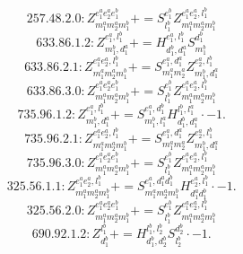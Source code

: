 \documentclass[letterpaper,10pt,fleqn,leqno,onecolumn]{article}
\begin{document}
\begin{equation} \;\;\;\;\;\;  257.48.2.0: Z^{e_{1}^{a}e_{2}^{a}e_{1}^{b}}_{m_{1}^{a}m_{2}^{a}m_{1}^{b}}+=S^{e_{1}^{b}}_{l_{1}^{b}}Z^{e_{1}^{a}e_{2}^{a},l_{1}^{b}}_{m_{1}^{a}m_{2}^{a}m_{1}^{b}} \end{equation}
\begin{equation} \;\;\;\;\;\;  633.86.1.2: Z^{e_{1}^{a},l_{1}^{b}}_{m_{1}^{b},d_{1}^{a}}+=H^{e_{1}^{a},l_{1}^{b}}_{d_{1}^{b},d_{1}^{a}}S^{d_{1}^{b}}_{m_{1}^{b}} \end{equation}
\begin{equation} \;\;\;\;\;\;  633.86.2.1: Z^{e_{1}^{a}e_{2}^{a},l_{1}^{b}}_{m_{1}^{a}m_{2}^{a}m_{1}^{b}}+=S^{e_{1}^{a},d_{1}^{a}}_{m_{1}^{a}m_{2}^{a}}Z^{e_{2}^{a},l_{1}^{b}}_{m_{1}^{b},d_{1}^{a}} \end{equation}
\begin{equation} \;\;\;\;\;\;  633.86.3.0: Z^{e_{1}^{a}e_{2}^{a}e_{1}^{b}}_{m_{1}^{a}m_{2}^{a}m_{1}^{b}}+=S^{e_{1}^{b}}_{l_{1}^{b}}Z^{e_{1}^{a}e_{2}^{a},l_{1}^{b}}_{m_{1}^{a}m_{2}^{a}m_{1}^{b}} \end{equation}
\begin{equation} \;\;\;\;\;\;  735.96.1.2: Z^{e_{1}^{a},l_{1}^{b}}_{m_{1}^{b},d_{1}^{a}}+=S^{e_{1}^{a},d_{1}^{b}}_{m_{1}^{b},l_{1}^{a}}H^{l_{1}^{b},l_{1}^{a}}_{d_{1}^{b},d_{1}^{a}}\cdot -1. \end{equation}
\begin{equation} \;\;\;\;\;\;  735.96.2.1: Z^{e_{1}^{a}e_{2}^{a},l_{1}^{b}}_{m_{1}^{a}m_{2}^{a}m_{1}^{b}}+=S^{e_{1}^{a},d_{1}^{a}}_{m_{1}^{a}m_{2}^{a}}Z^{e_{2}^{a},l_{1}^{b}}_{m_{1}^{b},d_{1}^{a}} \end{equation}
\begin{equation} \;\;\;\;\;\;  735.96.3.0: Z^{e_{1}^{a}e_{2}^{a}e_{1}^{b}}_{m_{1}^{a}m_{2}^{a}m_{1}^{b}}+=S^{e_{1}^{b}}_{l_{1}^{b}}Z^{e_{1}^{a}e_{2}^{a},l_{1}^{b}}_{m_{1}^{a}m_{2}^{a}m_{1}^{b}} \end{equation}
\begin{equation} \;\;\;\;\;\;  325.56.1.1: Z^{e_{1}^{a}e_{2}^{a},l_{1}^{b}}_{m_{1}^{a}m_{2}^{a}m_{1}^{b}}+=S^{e_{1}^{a},d_{1}^{a}d_{1}^{b}}_{m_{1}^{a}m_{2}^{a}m_{1}^{b}}H^{e_{2}^{a},l_{1}^{b}}_{d_{1}^{a}d_{1}^{b}}\cdot -1. \end{equation}
\begin{equation} \;\;\;\;\;\;  325.56.2.0: Z^{e_{1}^{a}e_{2}^{a}e_{1}^{b}}_{m_{1}^{a}m_{2}^{a}m_{1}^{b}}+=S^{e_{1}^{b}}_{l_{1}^{b}}Z^{e_{1}^{a}e_{2}^{a},l_{1}^{b}}_{m_{1}^{a}m_{2}^{a}m_{1}^{b}} \end{equation}
\begin{equation} \;\;\;\;\;\;  690.92.1.2: Z^{l_{1}^{b}}_{d_{1}^{b}}+=H^{l_{1}^{b},l_{2}^{b}}_{d_{1}^{b},d_{2}^{b}}S^{d_{2}^{b}}_{l_{2}^{b}}\cdot -1. \end{equation}
\end{document}

